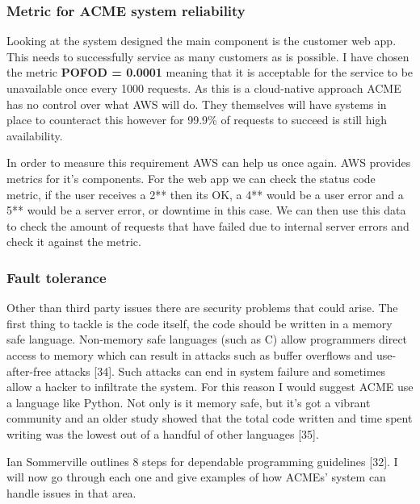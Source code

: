   \subsubsection{Metric for ACME system reliability}

  Looking at the system designed the main component is the customer web app. This needs to successfully service as many customers as is possible.
  I have chosen the metric \textbf{POFOD = 0.0001} meaning that it is acceptable for the service to be unavailable once every 1000 requests. As this is a 
  cloud-native approach ACME has no control over what AWS will do. They themselves will have systems in place to counteract this however for 99.9\% of
  requests to succeed is still high availability.

  In order to measure this requirement AWS can help us once again. AWS provides metrics for it's components. For the web app we can check the status code
  metric, if the user receives a 2** then its OK, a 4** would be a user error and a 5** would be a server error, or downtime in this case. We can 
  then use this data to check the amount of requests that have failed due to internal server errors and check it against the metric.

  \subsubsection{Fault tolerance}
  Other than third party issues there are security problems that could arise. The first thing to tackle is the code itself, the code should be written in 
  a memory safe language. Non-memory safe languages (such as C) allow programmers direct access to memory which can result in attacks such as buffer
  overflows and use-after-free attacks [34]. Such attacks can end in system failure and sometimes allow a hacker to infiltrate the system. For this 
  reason I would suggest ACME use a language like Python. Not only is it memory safe, but it's got a vibrant community and an older study showed
  that the total code written and time spent writing was the lowest out of a handful of other languages [35].

  Ian Sommerville outlines 8 steps for dependable programming guidelines [32]. I will now go through each one and give examples of how ACMEs' system can 
  handle issues in that area.

